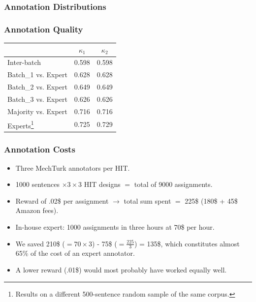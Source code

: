 \documentclass[10pt]{beamer}
\newenvironment{itemwide}%
{\begin{itemize}%
    \setlength{\itemsep}{5pt}%
    \setlength{\parskip}{5pt}}%
  {\end{itemize}}
\begin{document}
\begin{frame}
  \frametitle{Annotation Distributions}
  \begin{center}
  \end{center}
\end{frame}

\begin{frame}
  \frametitle{Annotation Quality}
\begin{center}
\begin{tabular}{|l|c|c|}
\hline
& $\kappa_{1}$ & $\kappa_{2}$ \\ 
\hline
Inter-batch & 0.598 & 0.598 \\ \hline
Batch\_1 vs. Expert & 0.628 & 0.628\\
Batch\_2 vs. Expert & 0.649 & 0.649\\
Batch\_3 vs. Expert & 0.626 & 0.626\\ \hline
Majority vs. Expert & 0.716 & 0.716\\ \hline
Experts\footnote{Results on a different 500-sentence random sample of the same corpus.} & 0.725 & 0.729\\ \hline
\end{tabular}
\end{center}
\end{frame}

\begin{frame}
  \frametitle{Annotation Costs}

\begin{itemwide}
 \item Three MechTurk annotators per HIT.
 \item 1000 sentences $\times 3 \times 3$ HIT designs $=$ total of 9000 assignments.
 \item Reward of .02\$ per assignment $\rightarrow$ total sum spent $=$ 225\$ (180\$ + 45\$ Amazon fees).
 \item In-house expert: 1000 assignments in three hours at 70\$ per hour.
 \item We saved 210\$ ($= 70 \times 3$) - 75\$ ($ = \frac{225}{3}$) = 135\$, which constitutes almost 65\% of the cost of an expert annotator.
 \item A lower reward (.01\$) would most probably have worked equally well.
\end{itemwide}
\end{frame}
\end{document}

